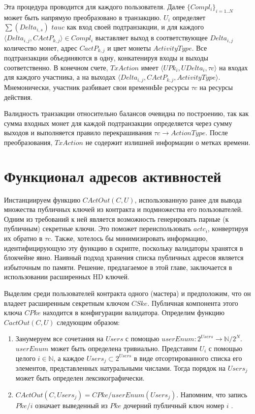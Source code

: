 \documentclass[]{itmo-student-thesis}
\begin{document}
Эта процедура проводится для каждого пользователя. Далее
$\{Compl_i\}_{i=1..N}$ может быть напрямую преобразовано в
транзакцию. $U_i$ определяет $\sum(Delta_{i,s})$ $tauc$ как вход своей
подтранзакции, и для каждого $\langle Delta_{i,j}, CActP_{k,j}\rangle
\in Compl_i$ выставляет выход в соответствующее $Delta_{i,j}$
количество монет, адрес $CactP_{k,j}$ и цвет монеты
$ActivityType$. Все подтранзакции объединяются в одну, конкатенируя
входы и выходы соответственно. В конечном счете, $TxAction$ имеет
$\langle UPk_i, UDelta_i, \tau c\rangle$ на входах для каждого
участника, а на выходах $\langle Delta_{i,j}, CActP_{k,j},
ActivityType\rangle$. Мнемонически, участник разбивает свои временнЫе
ресурсы $\tau c$ на ресурсы действия.

Валидность транзакции относительно балансов очевидна по построению,
так как сумма входных монет для каждой подтранзакции определяется
через сумму выходов и выполняется правило перекрашивания $\tau c
\rightarrow ActionType$. После преобразования, $TxAction$ не содержит
излишней информации о метках времени.

\section{Функционал адресов активностей}

Инстанциируем функцию $CActOut(C, U)$, использованную ранее для вывода
множества публичных ключей из контракта и подмножества его
пользователей. Одним из требований к ней является возможность
генерировать парные (к публичным) секретные ключи. Это поможет
переиспользовать $actc_i$, конвертируя их обратно в $\tau c$. Также,
хотелось бы минимизировать информацию, идентифицирующую эту функцию в
скрипте, поскольку валидаторы хранятся в блокчейне явно. Наивный
подход хранения списка публичных адресов является избыточным по
памяти. Решение, предлагаемое в этой главе, заключается в
использовании расширенных HD ключей.

Выделим среди пользователей контракта одного (мастера) и предположим,
что он владеет расширенным секретным ключом $CSke$. Публичная
компонента этого ключа $CPke$ находится в конфигурации
валидатора. Определим функцию $CactOut(C,U)$ следующим образом:

\begin{enumerate}
\item Занумеруем все сочетания на $Users$ с помощью $userEnum :
  2^{Users} \rightarrow \mathbb{N} / 2^N$. $userEnum$ может быть
  определена тривиально. Представим $U_i$ с помощью целого $i \in
  \mathbb{N}$, а каждое $Users_j \subset 2^{Users}$ в виде
  отсортированного списка его элементов, представленных натуральными
  числами. Тогда порядок на $Users_j$ может быть определен
  лексикографически.
\item $CActOut(C,Users_j) = CPke/userEnum(Users_j)$. Напомним, что
  запись $Pke/i$ означает выведенный из $Pke$ дочерний публичный ключ
  номер $i$ .
\end{enumerate}
\end{document}
